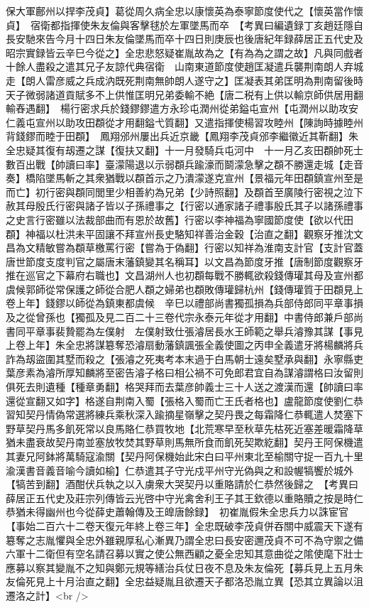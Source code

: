 保大軍鄜州以捍李茂貞】葛從周久病全忠以康懷英為泰寧節度使代之【懷英當作懷貞】　宿衛都指揮使朱友倫與客擊毬於左軍墜馬而卒　【考異曰編遺録丁亥趙廷隱自長安馳來告今月十四日朱友倫墜馬而卒十四日則庚辰也後唐紀年録薛居正五代史及昭宗實録皆云辛巳今從之】全忠悲怒疑崔胤故為之【有為為之謂之故】凡與同戲者十餘人盡殺之遣其兄子友諒代典宿衛　山南東道節度使趙匡凝遣兵襲荆南朗人弃城走【朗人雷彦威之兵成汭既死荆南無帥朗人遂守之】匡凝表其弟匡明為荆南留後時天子微弱諸道貢賦多不上供惟匡明兄弟委輸不絶【唐二税有上供以輸京師供居用翻輸舂遇翻】　楊行密求兵於錢鏐鏐遣方永珍屯潤州從弟鎰屯宣州【屯潤州以助攻安仁義屯宣州以助攻田頵從才用翻鎰弋質翻】又遣指揮使楊習攻睦州【陳詢時據睦州背錢鏐而睦于田頵】　鳳翔邠州屢出兵近京畿【鳳翔李茂貞邠李繼徽近其靳翻】朱全忠疑其復有刼遷之謀【復扶又翻】十一月發騎兵屯河中　十一月乙亥田頵帥死士數百出戰【帥讀曰率】臺濛陽退以示弱頵兵踰濠而鬬濛急擊之頵不勝還走城【走音奏】橋陷墜馬斬之其衆猶戰以頵首示之乃潰濛遂克宣州【景福元年田頵鎮宣州至是而亡】初行密與頵同閭里少相善約為兄弟【少詩照翻】及頵首至廣陵行密視之泣下赦其母殷氏行密與諸子皆以子孫禮事之【行密以通家諸子禮事殷氏其子以諸孫禮事之史言行密雖以法裁部曲而有恩於故舊】行密以李神福為寧國節度使【欲以代田頵】神福以杜洪未平固讓不拜宣州長史駱知祥善治金穀【治直之翻】觀察牙推沈文昌為文精敏嘗為頵草檄罵行密【嘗為于偽翻】行密以知祥為淮南支計官【支計官蓋唐世節度支度判官之屬唐末藩鎮變其名稱耳】以文昌為節度牙推【唐制節度觀察牙推在巡官之下幕府右職也】文昌湖州人也初頵每戰不勝輒欲殺錢傳瓘其母及宣州都虞候郭師從常保護之師從合肥人頵之婦弟也頵敗傳瓘歸杭州【錢傳瓘質于田頵見上卷上年】錢鏐以師從為鎮東都虞候　辛巳以禮部尚書獨孤損為兵部侍郎同平章事損及之從曾孫也【獨孤及見二百二十三卷代宗永泰元年從才用翻】中書侍郎兼戶部尚書同平章事裴贄罷為左僕射　左僕射致仕張濬居長水王師範之舉兵濬豫其謀【事見上卷上年】朱全忠將謀簒奪恐濬扇動藩鎮諷張全義使圖之丙申全義遣牙將楊麟將兵詐為刼盜圍其墅而殺之【張濬之死夷考本末過于白馬朝士遠矣墅承與翻】永寧縣吏葉彦素為濬所厚知麟將至密告濬子格曰相公禍不可免郎君宜自為謀濬謂格曰汝留則俱死去則遺種【種章勇翻】格哭拜而去葉彦帥義士三十人送之渡漢而還【帥讀曰率還從宣翻又如字】格遂自荆南入蜀【張格入蜀而亡王氏者格也】盧龍節度使劉仁恭習知契丹情偽常選將練兵乘秋深入踰摘星嶺擊之契丹畏之每霜降仁恭輒遣人焚塞下野草契丹馬多飢死常以良馬賂仁恭買牧地【北荒寒早至秋草先枯死近塞差暖霜降草猶未盡衰故契丹南並塞放牧焚其野草則馬無所食而飢死契欺紇翻】契丹王阿保機遣其妻兄阿鉢將萬騎寇渝關【契丹阿保機始此宋白曰平州東北至榆關守捉一百九十里渝漢書音義音喻今讀如榆】仁恭遣其子守光戍平州守光偽與之和設幄犒饗於城外【犒苦到翻】酒酣伏兵執之以入虜衆大哭契丹以重賂請於仁恭然後歸之　【考異曰薛居正五代史及莊宗列傳皆云光啓中守光禽舍利王子其王欽德以重賂贖之按是時仁恭猶未得幽州也今從薛史蕭翰傳及王皥唐餘録】　初崔胤假朱全忠兵力以誅宦官【事始二百六十二卷天復元年終上卷三年】全忠既破李茂貞併吞關中威震天下遂有簒奪之志胤懼與全忠外雖親厚私心漸異乃謂全忠曰長安密邇茂貞不可不為守禦之備六軍十二衛但有空名請召募以實之使公無西顧之憂全忠知其意曲從之隂使麾下壯士應募以察其變胤不之知與鄭元規等繕治兵仗日夜不息及朱友倫死【募兵見上五月朱友倫死見上十月治直之翻】全忠益疑胤且欲遷天子都洛恐胤立異【恐其立異論以沮遷洛之計】<br />
